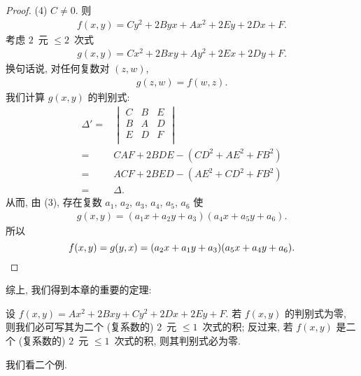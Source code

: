 \begin{proof}
    (4)
    \(C \neq 0\).
    则
    \begin{align*}
        f(x, y) = Cy^2 + 2Byx + Ax^2 + 2Ey + 2Dx + F.
    \end{align*}
    考虑 \(2\)~元 \({\leq} 2\)~次式
    \begin{align*}
        g(x, y) = Cx^2 + 2Bxy + Ay^2 + 2Ex + 2Dy + F.
    \end{align*}
    换句话说, 对任何复数对 \((z, w)\),
    \begin{align*}
        g(z, w) = f(w, z).
    \end{align*}
    我们计算 \(g(x, y)\) 的判别式:
    \begin{align*}
        \Delta'
        = {} &
        \begin{vmatrix}
            C & B & E \\
            B & A & D \\
            E & D & F \\
        \end{vmatrix}                           \\
        = {} & CAF + 2BDE - (CD^2 + AE^2 + FB^2) \\
        = {} & ACF + 2BED - (AE^2 + CD^2 + FB^2) \\
        = {} & \Delta.
    \end{align*}
    从而, 由 (3),
    存在复数
    \(a_1\), \(a_2\), \(a_3\), \(a_4\), \(a_5\), \(a_6\)
    使
    \begin{align*}
        g(x, y) = (a_1 x + a_2 y + a_3) (a_4 x + a_5 y + a_6).
    \end{align*}
    所以
    \begin{equation*}
        f(x, y) = g(y, x) = (a_2 x + a_1 y + a_3) (a_5 x + a_4 y + a_6).
        \qedhere
    \end{equation*}
\end{proof}

综上, 我们得到本章的重要的定理:

\begin{theorem}
    设 \(f(x, y) = Ax^2 + 2Bxy + Cy^2 + 2Dx + 2Ey + F\).
    若 \(f(x, y)\) 的判别式为零,
    则我们必可写其为二个 (复系数的)
    \(2\)~元 \({\leq} 1\)~次式的积;
    反过来,
    若 \(f(x, y)\) 是二个 (复系数的)
    \(2\)~元 \({\leq} 1\)~次式的积,
    则其判别式必为零.
\end{theorem}

我们看二个例.

